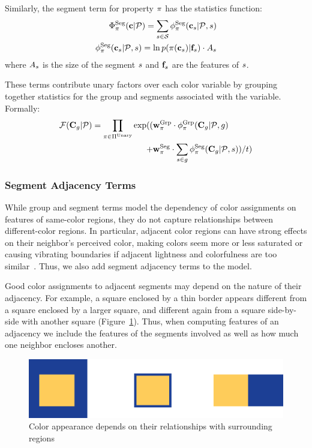 Similarly, the segment term for property $\pi$ has the statistics function:
\begin{align*}
 \Phi^{\textrm{Seg}}_\pi(\mathbf{c}|\mathcal{P}) = \sum_{s \in \mathcal{S}} \phi^{\textrm{Seg}}_\pi(\mathbf{c}_s | \mathcal{P}, s) \\
 \phi^{\textrm{Seg}}_\pi(\mathbf{c}_s | \mathcal{P}, s) = \ln p( \pi( \mathbf{c}_s ) | \mathbf{f}_s) \cdot A_s
\end{align*}
where $A_s$ is the size of the segment $s$ and $\mathbf{f}_s$ are the features of $s$.

These terms contribute unary factors over each color variable by grouping together statistics for the group and segments associated with the variable. Formally:
\begin{align*}
 \mathcal{F}(\mathbf{C}_g | \mathcal{P}) = \prod_{\pi \in \Pi^{\textrm{Unary}}}
 		\exp( (&\mathbf{w}^{\textrm{Grp}}_\pi \cdot \phi^{\textrm{Grp}}_\pi(\mathbf{C}_g | \mathcal{P}, g)  \\
 		     + &\mathbf{w}^{\textrm{Seg}}_\pi \cdot \sum_{s \in g} \phi^{\textrm{Seg}}_\pi(\mathbf{C}_g | \mathcal{P}, s)) / t) 
\end{align*}


\subsubsection{Segment Adjacency Terms}
\label{sec:adjTerms}

While group and segment terms model the dependency of color assignments on features of same-color regions, they do not capture relationships between different-color regions. In particular, adjacent color regions can have strong effects on their neighbor's perceived color, making colors seem more or less saturated or causing vibrating boundaries if adjacent lightness and colorfulness are too similar~\cite{AlbersInteractionOfColor}. Thus, we also add segment adjacency terms to the model.

Good color assignments to adjacent segments may depend on the nature of their adjacency. For example, a square enclosed by a thin border appears different from a square enclosed by a larger square, and different again from a square side-by-side with another square (Figure~\ref{fig:surround}). Thus, when computing features of an adjacency we include the features of the segments involved as well as how much one neighbor encloses another.
\begin{figure}[ht]
\centering
\includegraphics[width=.7\columnwidth]{figs/surround}
\caption{Color appearance depends on their relationships with surrounding regions}
\label{fig:surround}
\end{figure}



